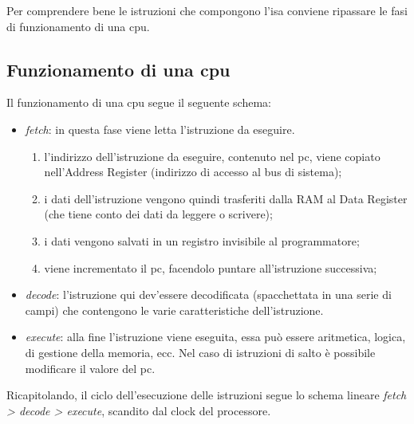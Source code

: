 \documentclass[class=book, crop=false, oneside]{standalone}
\begin{document}
Per comprendere bene le istruzioni che compongono l'\acrshort{isa} conviene ripassare le fasi di funzionamento di una \acrshort{cpu}.

\subsection{Funzionamento di una \acrshort{cpu}}\label{subsec:cpu}
Il funzionamento di una \acrshort{cpu} segue il seguente schema:
\begin{itemize}
	\item \emph{fetch}: in questa fase viene letta l'istruzione da eseguire.
	\begin{enumerate}
		\item l'indirizzo dell'istruzione da eseguire, contenuto nel \acrfull{pc}, viene copiato nell'Address Register (indirizzo di accesso al bus di sistema);
		\item i dati dell'istruzione vengono quindi trasferiti dalla RAM al Data Register (che tiene conto dei dati da leggere o scrivere);
		\item i dati vengono salvati in un registro invisibile al programmatore;
		\item viene incrementato il \acrshort{pc}, facendolo puntare all'istruzione successiva;
	\end{enumerate}
	\item \emph{decode}: l’istruzione qui dev’essere decodificata (spacchettata in una serie di campi) che contengono le varie caratteristiche dell’istruzione.
	\item \emph{execute}: alla fine l’istruzione viene eseguita, essa può essere aritmetica, logica, di gestione della memoria, ecc. Nel caso di istruzioni di salto è possibile modificare il valore del \acrshort{pc}.
\end{itemize}
Ricapitolando, il ciclo dell’esecuzione delle istruzioni segue lo schema lineare \emph{fetch > decode > execute}, scandito dal clock del processore.
\end{document}
